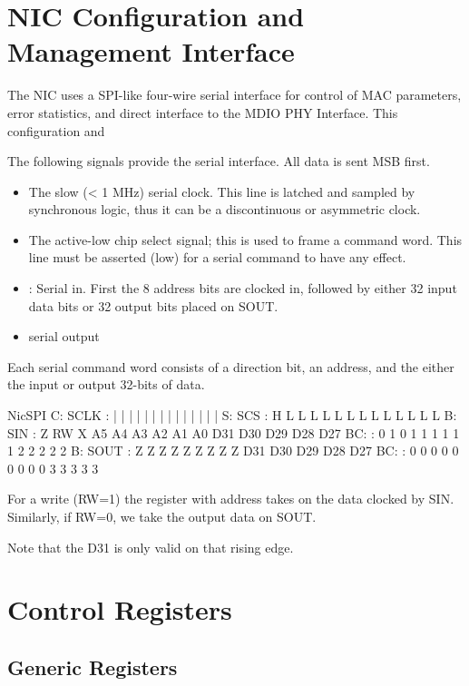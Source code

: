 \section{NIC Configuration and Management Interface}
The NIC uses a SPI-like four-wire serial interface for control of MAC parameters, error statistics, and direct interface to the MDIO PHY Interface. This configuration and 


The following signals provide the serial interface. All data is sent MSB first. 
\begin{itemize}
\item {} The slow (< 1 MHz) serial clock. This line is latched and sampled by synchronous logic, thus it can be a discontinuous or asymmetric clock.
\item {} The active-low chip select signal; this is used to frame a command word. This line must be asserted (low) for a serial command to have any effect. 
\item {} : Serial in. First the 8 address bits are clocked in, followed by either 32 input data bits or 32 output bits placed on SOUT.
\item {} serial output
\end{itemize}

Each serial command word consists of a direction bit, an address, and the either the input or output 32-bits of data. 

\begin{timing}{NicSPI}
C: SCLK    :  |  |  |  |  |  |  |  |  |  |   |   |   |   |  
S: SCS     :  H  L  L  L  L  L  L  L  L  L   L   L   L   L  
B: SIN     :  Z  RW X  A5 A4 A3 A2 A1 A0 D31 D30 D29 D28 D27 
BC:        :  0  1  0  1  1  1  1  1  1  2   2   2   2   2
B: SOUT    :  Z  Z  Z  Z  Z  Z  Z  Z  Z  D31 D30 D29 D28 D27
BC:        :  0  0  0  0  0  0  0  0  0  3   3   3   3   3 
\end{timing}

For a write (RW=1) the register with address  takes on the data clocked by SIN. Similarly, if RW=0, we take the output data on SOUT. 

Note that the D31 is only valid on that rising edge. 

\section{Control Registers}



\subsection{Generic Registers}


